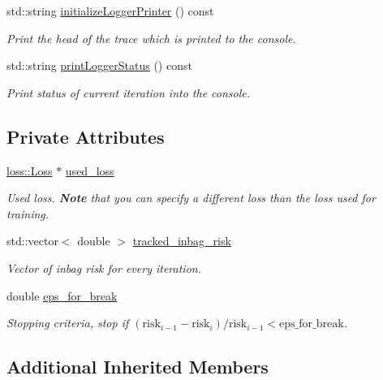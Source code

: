 \begin{DoxyCompactItemize}
std\+::string \mbox{\hyperlink{classlogger_1_1_inbag_risk_logger_ab793454f28dae8d0901852b41a910ec7}{initialize\+Logger\+Printer}} () const
\begin{DoxyCompactList}\small\item\em Print the head of the trace which is printed to the console. \end{DoxyCompactList}\item 
std\+::string \mbox{\hyperlink{classlogger_1_1_inbag_risk_logger_a040213adf29a645f0fd5356b951627d0}{print\+Logger\+Status}} () const
\begin{DoxyCompactList}\small\item\em Print status of current iteration into the console. \end{DoxyCompactList}\end{DoxyCompactItemize}
\subsection*{Private Attributes}
\begin{DoxyCompactItemize}
\item 
\mbox{\hyperlink{classloss_1_1_loss}{loss\+::\+Loss}} $\ast$ \mbox{\hyperlink{classlogger_1_1_inbag_risk_logger_afee746bf4009661f930ea8294e7f72fc}{used\+\_\+loss}}
\begin{DoxyCompactList}\small\item\em Used loss. {\bfseries Note} that you can specify a different loss than the loss used for training. \end{DoxyCompactList}\item 
std\+::vector$<$ double $>$ \mbox{\hyperlink{classlogger_1_1_inbag_risk_logger_aed427deee828fd480e5fa9536360b16b}{tracked\+\_\+inbag\+\_\+risk}}
\begin{DoxyCompactList}\small\item\em Vector of inbag risk for every iteration. \end{DoxyCompactList}\item 
double \mbox{\hyperlink{classlogger_1_1_inbag_risk_logger_a1890b49b8ffe85e1bc65b4f8ab7999fe}{eps\+\_\+for\+\_\+break}}
\begin{DoxyCompactList}\small\item\em Stopping criteria, stop if $(\mathrm{risk}_{i-1} - \mathrm{risk}_i) / \mathrm{risk}_{i-1} < \mathrm{eps\_for\_break}$. \end{DoxyCompactList}\end{DoxyCompactItemize}
\subsection*{Additional Inherited Members}


